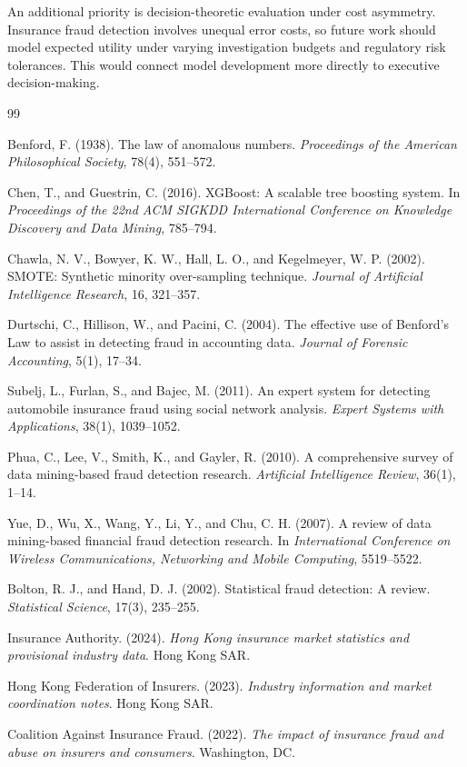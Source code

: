 \documentclass[12pt,a4paper]{report}
\begin{document}
An additional priority is decision-theoretic evaluation under cost asymmetry. Insurance fraud detection involves unequal error costs, so future work should model expected utility under varying investigation budgets and regulatory risk tolerances. This would connect model development more directly to executive decision-making.

\renewcommand{\bibname}{References}
\begin{thebibliography}{99}

Benford, F. (1938). The law of anomalous numbers. \textit{Proceedings of the American Philosophical Society}, 78(4), 551--572.

Chen, T., and Guestrin, C. (2016). XGBoost: A scalable tree boosting system. In \textit{Proceedings of the 22nd ACM SIGKDD International Conference on Knowledge Discovery and Data Mining}, 785--794.

Chawla, N. V., Bowyer, K. W., Hall, L. O., and Kegelmeyer, W. P. (2002). SMOTE: Synthetic minority over-sampling technique. \textit{Journal of Artificial Intelligence Research}, 16, 321--357.

Durtschi, C., Hillison, W., and Pacini, C. (2004). The effective use of Benford's Law to assist in detecting fraud in accounting data. \textit{Journal of Forensic Accounting}, 5(1), 17--34.

Subelj, L., Furlan, S., and Bajec, M. (2011). An expert system for detecting automobile insurance fraud using social network analysis. \textit{Expert Systems with Applications}, 38(1), 1039--1052.

Phua, C., Lee, V., Smith, K., and Gayler, R. (2010). A comprehensive survey of data mining-based fraud detection research. \textit{Artificial Intelligence Review}, 36(1), 1--14.

Yue, D., Wu, X., Wang, Y., Li, Y., and Chu, C. H. (2007). A review of data mining-based financial fraud detection research. In \textit{International Conference on Wireless Communications, Networking and Mobile Computing}, 5519--5522.

Bolton, R. J., and Hand, D. J. (2002). Statistical fraud detection: A review. \textit{Statistical Science}, 17(3), 235--255.

Insurance Authority. (2024). \textit{Hong Kong insurance market statistics and provisional industry data}. Hong Kong SAR.

Hong Kong Federation of Insurers. (2023). \textit{Industry information and market coordination notes}. Hong Kong SAR.

Coalition Against Insurance Fraud. (2022). \textit{The impact of insurance fraud and abuse on insurers and consumers}. Washington, DC.

\end{thebibliography}
\end{document}
